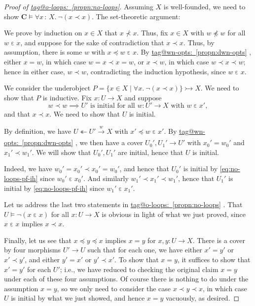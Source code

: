 \documentclass{amsart}
\makeatletter
\newcommand\bC{\mathbf{C}}
\newcommand\ein{\mathrel{\varepsilon}}
\newcommand\FORALL{\text{ for all }}
\newcommand\oot{\twoheadleftarrow}
\newcommand\set[2][]{#1\{ #2 #1\}}
\newcommand\tolon{{\,:\,}}
\newcommand\tox[2][]{\xrightarrow[#1]{#2}}
\newcommand\tto{\rightarrowtail}
\newcommand\WITH{\text{ with }}
\newcommand\tagword[1]{\csname tag@#1\endcsname}
\def\label@tag#1:#2\@nil{#1}
\newcommand\labeltag[1]{\label@tag#1:\@nil}
\newcommand\jref[1]{%
  \texorpdfstring%
    {\hyperref[#1]{\tagword{\labeltag{#1}}~\ref*{#1}}}%
    {\tagword{\labeltag{#1}}~\ref*{#1}}%
}
\theoremstyle{definition}
\theoremstyle{remark}
\theoremstyle{plainwithref}
\newenvironment{settybox}{\begin{tcolorbox}[colback=blue!20,breakable%
    ,enhanced%
    ,sharp corners%
    ,frame hidden%
    ,boxsep=0pt
    ,left=5pt,right=5pt,top=5pt,bottom=5pt
    ,enlarge left by=-5pt,width=\linewidth+10pt
    ,enlarge top by=5pt,enlarge bottom by=5pt
    ,before skip balanced=0pt,after skip balanced=0pt
    ]}{\end{tcolorbox}}
\makeatother
\begin{document}
\begin{proof}[Proof of \jref{propn:no-loops}] \label{proof:no-loops}
  Assuming \( X \) is well-founded, we need to show \( \bC \vDash \forall x \tolon X.\ \neg (x \prec x) \).
  The set-theoretic argument:
  \begin{settybox}
    We prove by induction on \( x \in X \) that \( x \not\prec x \).
    Thus, fix \( x \in X \) with \( w \not\preceq w \) for all \( w \ein x \), and suppose for the sake of contradiction that \( x \prec x \).
    Thus, by assumption, there is some \( w \) with \( x \preceq w \ein x \).
    By \jref{propn:dwn-opts}, either \( x = w \), in which case \( w = x \prec x = w \), or \( x \prec w \), in which case \( w \prec x \prec w \); hence in either case, \( w \prec w \), contradicting the induction hypothesis, since \( w \ein x \).
  \end{settybox}
  We consider the underobject \( P = \set{x \in X \mid \forall x.\ \neg (x \prec x)} \tto X \).
  We need to show that \( P \) is inductive.
  Fix \( x \colon U \to X \) and suppose
  \begin{equation} \label{eq:no-loops-pf-ih}
    w \prec w \implies U' \text{ is initial} \FORALL w \colon U' \to X \WITH w \ein x',
  \end{equation}
  and that \( x \prec x \).
  We need to show that \( U \) is initial.

  By definition, we have \( U \oot U' \tox{w} X \) with \( x' \preceq w \ein x' \).
  By \jref{propn:dwn-opts}, we then have a cover \( U_0',U_1' \to U' \) with \( x_0' = w_0' \) and \( x_1' \prec w_1' \).
  We will show that \( U_0',U_1' \) are initial, hence that \( U \) is initial.

  Indeed, we have \( w_0' = x_0' \prec x_0' = w_0' \), and hence that \( U_0' \) is initial by \eqref{eq:no-loops-pf-ih} since \( w_0' \ein x_0' \).
  And similarly \( w_1' \prec x_1' \prec w_1' \), hence that \( U_1' \) is initial by \eqref{eq:no-loops-pf-ih} since \( w_1' \ein x_1' \).

  Let us address the last two statements in \jref{propn:no-loops}.
  That \( U \vDash \neg (x \ein x) \) for all \( x \colon U \to X \) is obvious in light of what we just proved, since \( x \ein x \) implies \( x \prec x \).

  Finally, let us see that \( x \preceq y \preceq x \) implies \( x = y \) for \( x,y \colon U \to X \).
  There is a cover by four morphisms \( U' \to U \) such that for each one, we have either \( x' = y' \) or \( x' \prec y' \), and either \( y' = x' \) or \( y ' \prec x' \).
  To show that \( x = y \), it suffices to show that \( x' = y' \) for each \( U' \); i.e., we have reduced to checking the original claim \( x = y \) under each of these four assumptions.
  Of course there is nothing to do under the assumption \( x = y \), so we only need to consider the case \( x \prec y \prec x \), in which case \( U \) is initial by what we just showed, and hence \( x = y \) vacuously, as desired.
\end{proof}
\end{document}
